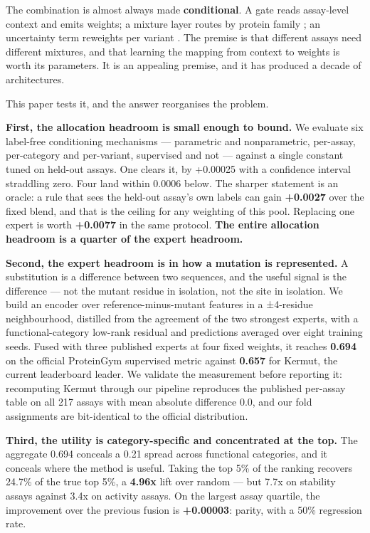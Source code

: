 \documentclass{article}
\begin{document}
The combination is almost always made \textbf{conditional}. A gate reads assay-level context and emits
weights; a mixture layer routes by protein family \cite{jacobs1991,shazeer2017}; an uncertainty
term reweights per variant \cite{deepsong}. The
premise is that different assays need different mixtures, and that learning the mapping from context to
weights is worth its parameters. It is an appealing premise, and it has produced a decade of
architectures.

This paper tests it, and the answer reorganises the problem.

\textbf{First, the allocation headroom is small enough to bound.} We evaluate six label-free conditioning
mechanisms --- parametric and nonparametric, per-assay, per-category and per-variant, supervised and not ---
against a single constant tuned on held-out assays. One clears it, by +0.00025 with a confidence
interval straddling zero. Four land within 0.0006 below. The sharper statement is an oracle: a rule that
sees the held-out assay's own labels can gain \textbf{+0.0027} over the fixed blend, and that is the ceiling
for any weighting of this pool. Replacing one expert is worth \textbf{+0.0077} in the same protocol. \textbf{The
entire allocation headroom is a quarter of the expert headroom.}

\textbf{Second, the expert headroom is in how a mutation is represented.} A substitution is a difference
between two sequences, and the useful signal is the difference --- not the mutant residue in isolation, not
the site in isolation. We build an encoder over reference-minus-mutant features in a ±4-residue
neighbourhood, distilled from the agreement of the two strongest experts, with a functional-category
low-rank residual and predictions averaged over eight training seeds. Fused with three published experts
at four fixed weights, it reaches \textbf{0.694} on the official ProteinGym supervised metric against
\textbf{0.657} for Kermut, the current leaderboard leader. We validate the measurement before reporting it:
recomputing Kermut through our pipeline reproduces the published per-assay table on all 217 assays with
mean absolute difference 0.0, and our fold assignments are bit-identical to the official distribution.

\textbf{Third, the utility is category-specific and concentrated at the top.} The aggregate 0.694 conceals
a 0.21 spread across functional categories, and it conceals where the method is useful. Taking the top
5\% of the ranking recovers 24.7\% of the true top 5\%, a \textbf{4.96x} lift over random --- but 7.7x on
stability assays against 3.4x on activity assays. On the largest assay quartile, the improvement over
the previous fusion is \textbf{+0.00003}: parity, with a 50\% regression rate.
\end{document}
